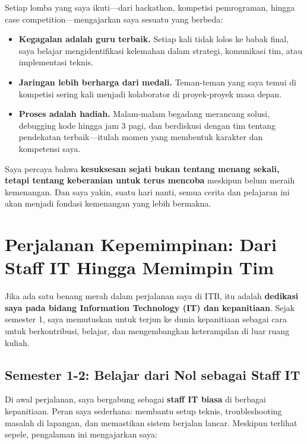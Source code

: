 \documentclass[
  letterpaper,
  DIV=11,
  numbers=noendperiod]{scrreprt}
\providecommand{\tightlist}{%
  \setlength{\itemsep}{0pt}\setlength{\parskip}{0pt}}
\begin{document}
Setiap lomba yang saya ikuti---dari hackathon, kompetisi pemrograman,
hingga case competition---mengajarkan saya sesuatu yang berbeda:

\begin{itemize}
\tightlist
\item
  \textbf{Kegagalan adalah guru terbaik.} Setiap kali tidak lolos ke
  babak final, saya belajar mengidentifikasi kelemahan dalam strategi,
  komunikasi tim, atau implementasi teknis.
\item
  \textbf{Jaringan lebih berharga dari medali.} Teman-teman yang saya
  temui di kompetisi sering kali menjadi kolaborator di proyek-proyek
  masa depan.
\item
  \textbf{Proses adalah hadiah.} Malam-malam begadang merancang solusi,
  debugging kode hingga jam 3 pagi, dan berdiskusi dengan tim tentang
  pendekatan terbaik---itulah momen yang membentuk karakter dan
  kompetensi saya.
\end{itemize}

Saya percaya bahwa \textbf{kesuksesan sejati bukan tentang menang
sekali, tetapi tentang keberanian untuk terus mencoba} meskipun belum
meraih kemenangan. Dan saya yakin, suatu hari nanti, semua cerita dan
pelajaran ini akan menjadi fondasi kemenangan yang lebih bermakna.

\section{\texorpdfstring{\textbf{Perjalanan Kepemimpinan: Dari Staff IT
Hingga Memimpin
Tim}}{Perjalanan Kepemimpinan: Dari Staff IT Hingga Memimpin Tim}}\label{perjalanan-kepemimpinan-dari-staff-it-hingga-memimpin-tim}

Jika ada satu benang merah dalam perjalanan saya di ITB, itu adalah
\textbf{dedikasi saya pada bidang Information Technology (IT) dan
kepanitiaan}. Sejak semester 1, saya memutuskan untuk terjun ke dunia
kepanitiaan sebagai cara untuk berkontribusi, belajar, dan mengembangkan
keterampilan di luar ruang kuliah.

\subsection{\texorpdfstring{\textbf{Semester 1-2: Belajar dari Nol
sebagai Staff
IT}}{Semester 1-2: Belajar dari Nol sebagai Staff IT}}\label{semester-1-2-belajar-dari-nol-sebagai-staff-it}

Di awal perjalanan, saya bergabung sebagai \textbf{staff IT biasa} di
berbagai kepanitiaan. Peran saya sederhana: membantu setup teknis,
troubleshooting masalah di lapangan, dan memastikan sistem berjalan
lancar. Meskipun terlihat sepele, pengalaman ini mengajarkan saya:
\end{document}
